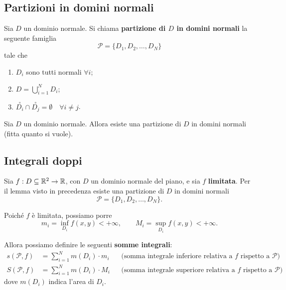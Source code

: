 
\subsection{Partizioni in domini normali}

\begin{definition}
    Sia $D$ un dominio normale. Si chiama \textbf{partizione di $D$ in domini normali} la seguente famiglia
    \[
        \mathcal{P} = \{ D_1, D_2, \dots, D_N \}
    \]
    tale che
    \begin{enumerate}[1)]
        \item $D_i$ sono tutti normali $\forall i$;
        \item $\displaystyle D = \bigcup_{i=1}^{N} D_i$;
        \item $\overset{\circ}{D_i} \cap \overset{\circ}{D_j} = \emptyset \quad \forall i \neq j$.
    \end{enumerate}
\end{definition}

\begin{lemma*}
    Sia $D$ un dominio normale. Allora esiste una partizione di $D$ in domini normali (fitta quanto si vuole).
\end{lemma*}

%   
%   

\subsection{Integrali doppi}

Sia $f : D \subseteq \mathbb{R}^2 \rightarrow \mathbb{R}$, con $D$ un dominio normale del piano, e sia $f$ \textbf{limitata}.
Per il lemma visto in precedenza esiste una partizione di $D$ in domini normali
\[
    \mathcal{P} = \{ D_1, D_2, \dots, D_N \}.
\]

Poiché $f$ è limitata, possiamo porre
\[
    m_i = \inf_{D_i} f(x,y) < +\infty, \qquad
    M_i = \sup_{D_i} f(x,y) < +\infty .
\]

Allora possiamo definire le seguenti \textbf{somme integrali}:
\begin{align*}
    s(\mathcal{P}, f) &= \sum_{i=1}^{N} m(D_i) \cdot m_i
    && \text{(somma integrale inferiore relativa a $f$ rispetto a $\mathcal{P}$)} \\
    S(\mathcal{P}, f) &= \sum_{i=1}^{N} m(D_i) \cdot M_i
    && \text{(somma integrale superiore relativa a $f$ rispetto a $\mathcal{P}$)}
\end{align*}
dove $m(D_i)$ indica l'area di $D_i$.

